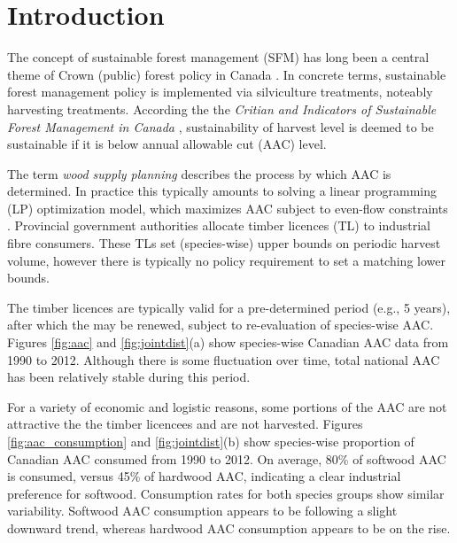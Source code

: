 \section{Introduction}
\label{sec:introduction}

The concept of sustainable forest management (SFM) has long been a central theme of Crown (public) forest policy in Canada \citep{ccfm2008vision}. In concrete terms, sustainable forest management policy is implemented via silviculture treatments, noteably harvesting treatments. According the the \emph{Critian and Indicators of Sustainable Forest Management in Canada} \citep{ccfm2006criteria}, sustainability of harvest level is deemed to be sustainable if it is below annual allowable cut (AAC) level. 

The term \emph{wood supply planning} describes the process by which AAC is determined. In practice this typically amounts to solving a linear programming (LP) optimization model, which maximizes AAC subject to even-flow constraints \citep{gunn2007models}. Provincial government authorities allocate timber licences (TL) to industrial fibre consumers. These TLs set (species-wise) upper bounds on periodic harvest volume, however there is typically no policy requirement to set a matching lower bounds. 



The timber licences are typically valid for a pre-determined period (e.g., 5 years), after which the may be renewed, subject to re-evaluation of species-wise AAC. Figures \ref{fig:aac} and \ref{fig:jointdist}(a) show species-wise Canadian AAC data from 1990 to 2012. Although there is some fluctuation over time, total national AAC has been relatively stable during this period.

For a variety of economic and logistic reasons, some portions of the AAC are not attractive the the timber licencees and are not harvested. Figures \ref{fig:aac_consumption} and \ref{fig:jointdist}(b) show species-wise proportion of Canadian AAC consumed from 1990 to 2012. On average, 80\% of softwood AAC is consumed, versus 45\% of hardwood AAC, indicating a clear industrial preference for softwood. Consumption rates for both species groups show similar variability. Softwood AAC consumption appears to be following a slight downward trend, whereas hardwood AAC consumption appears to be on the rise. 

